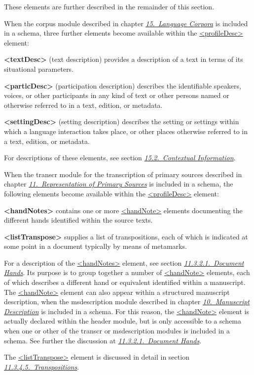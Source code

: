  These elements are further described in the remainder of this section.\par
When the \textsf{corpus} module described in chapter \textit{\hyperref[CC]{15.\ Language Corpora}} is included in a schema, three further elements become available within the \hyperref[TEI.profileDesc]{<profileDesc>} element: 
\begin{sansreflist}
  
\item [\textbf{<textDesc>}] (text description) provides a description of a text in terms of its situational parameters.
\item [\textbf{<particDesc>}] (participation description) describes the identifiable speakers, voices, or other participants in any kind of text or other persons named or otherwise referred to in a text, edition, or metadata.
\item [\textbf{<settingDesc>}] (setting description) describes the setting or settings within which a language interaction takes place, or other places otherwise referred to in a text, edition, or metadata.
\end{sansreflist}
 For descriptions of these elements, see section \textit{\hyperref[CCAH]{15.2.\ Contextual Information}}.\par
When the \textsf{transcr} module for the transcription of primary sources described in chapter \textit{\hyperref[PH]{11.\ Representation of Primary Sources}} is included in a schema, the following elements become available within the \hyperref[TEI.profileDesc]{<profileDesc>} element: 
\begin{sansreflist}
  
\item [\textbf{<handNotes>}] contains one or more \hyperref[TEI.handNote]{<handNote>} elements documenting the different hands identified within the source texts.
\item [\textbf{<listTranspose>}] supplies a list of transpositions, each of which is indicated at some point in a document typically by means of metamarks.
\end{sansreflist}
 For a description of the \hyperref[TEI.handNotes]{<handNotes>} element, see section \textit{\hyperref[PHDH]{11.3.2.1.\ Document Hands}}. Its purpose is to group together a number of \hyperref[TEI.handNote]{<handNote>} elements, each of which describes a different hand or equivalent identified within a manuscript. The \hyperref[TEI.handNote]{<handNote>} element can also appear within a structured manuscript description, when the \textsf{msdescription} module described in chapter \textit{\hyperref[MS]{10.\ Manuscript Description}} is included in a schema. For this reason, the \hyperref[TEI.handNote]{<handNote>} element is actually declared within the header module, but is only accessible to a schema when one or other of the \textsf{transcr} or \textsf{msdescription} modules is included in a schema. See further the discussion at \textit{\hyperref[PHDH]{11.3.2.1.\ Document Hands}}.\par
The \hyperref[TEI.listTranspose]{<listTranspose>} element is discussed in detail in section \textit{\hyperref[transpo]{11.3.4.5.\ Transpositions}}.
